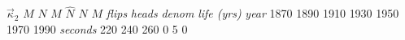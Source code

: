 \documentclass{book}
\begin{document}
{\small $\vec{\kappa}_2$}%
\stopmpxshipout
\mpxshipout%
{\small $M$}%
\stopmpxshipout
\mpxshipout%
{\small $N$}%
\stopmpxshipout
\mpxshipout%
{\small $M$}%
\stopmpxshipout
\mpxshipout%
{\small $\hat{N}$}%
\stopmpxshipout
\mpxshipout%
{\small $N$}%
\stopmpxshipout
\mpxshipout%
{\small $M$}%
\stopmpxshipout
\mpxshipout%
{\scriptsize \textit{flips}}%
\stopmpxshipout
\mpxshipout%
{}%
\stopmpxshipout
\mpxshipout%
{}%
\stopmpxshipout
\mpxshipout%
{}%
\stopmpxshipout
\mpxshipout%
{\scriptsize \textit{heads}}%
\stopmpxshipout
\mpxshipout%
{}%
\stopmpxshipout
\mpxshipout%
{}%
\stopmpxshipout
\mpxshipout%
{\scriptsize \textit{denom}}%
\stopmpxshipout
\mpxshipout%
{}%
\stopmpxshipout
\mpxshipout%
{}%
\stopmpxshipout
\mpxshipout%
{}%
\stopmpxshipout
\mpxshipout%
{}%
\stopmpxshipout
\mpxshipout%
{}%
\stopmpxshipout
\mpxshipout%
{\scriptsize \textit{life (yrs)}}%
\stopmpxshipout
\mpxshipout%
{}%
\stopmpxshipout
\mpxshipout%
{}%
\stopmpxshipout
\mpxshipout%
{\small \textit{year}}%
\stopmpxshipout
\mpxshipout%
{\scriptsize 1870}%
\stopmpxshipout
\mpxshipout%
{\scriptsize 1890}%
\stopmpxshipout
\mpxshipout%
{\scriptsize 1910}%
\stopmpxshipout
\mpxshipout%
{\scriptsize 1930}%
\stopmpxshipout
\mpxshipout%
{\scriptsize 1950}%
\stopmpxshipout
\mpxshipout%
{\scriptsize 1970}%
\stopmpxshipout
\mpxshipout%
{\scriptsize 1990}%
\stopmpxshipout
\mpxshipout%
{\small \textit{seconds}}%
\stopmpxshipout
\mpxshipout%
{\scriptsize 220}%
\stopmpxshipout
\mpxshipout%
{\scriptsize 240}%
\stopmpxshipout
\mpxshipout%
{\scriptsize 260}%
\stopmpxshipout
\mpxshipout%
{\tiny 0}%
\stopmpxshipout
\mpxshipout%
{\tiny 5}%
\stopmpxshipout
\mpxshipout%
{\tiny 0}%
\stopmpxshipout
\end{document}
